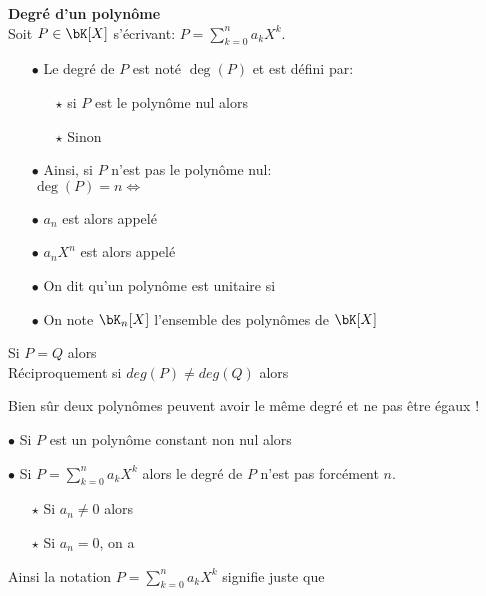 \documentclass[a4paper, 11pt,reqno]{article}
\begin{document}
\begin{defi} \textbf{Degr\'e d'un polyn\^ome}\\
	\noindent Soit $P\in\bK\lbrack X\rbrack$ s'\'ecrivant: $P=\sum\limits_{k=0}^n a_kX^k$.
	\begin{itemize}
		\item[$\bullet$] Le degr\'e de $P$ est not\'e $\deg (P)$ et est d\'efini par:\vsec
		      \begin{itemize}
			      \item[$\star$] si $P$ est le polyn\^{o}me nul alors \dotfill \vsec
			      \item[$\star$] Sinon \dotfill\vsec
		      \end{itemize}
		\item[$\bullet$] Ainsi, si $P$ n'est pas le polyn\^ome nul:
		      $$\deg(P)=n \Longleftrightarrow  \hspace{11cm}   $$
		\item[$\bullet$] $a_n$ est alors appel\'e \dotfill \vsec
		\item[$\bullet$] $a_nX^n$ est alors appel\'e \dotfill \vsec
		\item[$\bullet$] On dit qu'un polyn\^ome est unitaire si \dotfill \vsec
		\item[$\bullet$] On note $\bK_n\lbrack X\rbrack$ l'ensemble des polyn\^omes de $\bK\lbrack X\rbrack$ \dotfill \vsec
	\end{itemize}
\end{defi}


\begin{prop}
	Si $P=Q$ alors $$ $$
	Réciproquement si $ deg(P) \neq deg(Q)$ alors
	$$ $$
\end{prop}
\begin{remarques}
	\item Bien s\^{u}r deux polyn\^{o}mes peuvent avoir le m\^{e}me degr\'e et ne pas \^etre \'egaux !

	\item[$\bullet$] Si $P$ est un polyn\^ome constant non nul alors \dotfill \vsec

	\item[$\bullet$]  Si $P=\sum\limits_{k=0}^n a_kX^k$ alors le degr\'e de $P$ n'est pas forc\'ement $n$.
	\begin{itemize}
		\item[$\star$] Si $a_n\not= 0$ alors \dotfill \vsec
		\item[$\star$] Si $a_n=0$, on a \dotfill \vsec
	\end{itemize}
	Ainsi la notation $P=\sum\limits_{k=0}^n a_k X^k$ signifie juste que \dotfill

\end{remarques}\vsec
\end{document}
